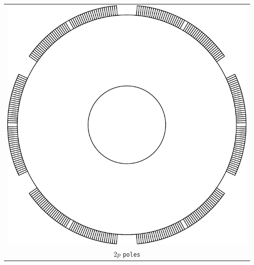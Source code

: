 \documentclass[a4paper,11pt,oneside]{report}
\begin{document}
\begin{tabular}{c}
\includegraphics[scale=0.75]{../SPM/examples/rotors/2ppole} 
\\
$ 2p $ \texttt{poles}
\end{tabular}
\end{document}
